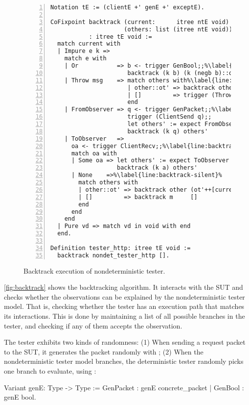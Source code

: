 \begin{figure}
\begin{lstlisting}[numbers=left]
Notation tE := (clientE +' genE +' exceptE).

CoFixpoint backtrack (current:      itree ntE void)
                     (others: list (itree ntE void))
           : itree tE void :=
  match current with
  | Impure e k =>
    match e with
    | Or           => b <- trigger GenBool;;%\label{line:backtrack-or}%
                      backtrack (k b) (k (negb b)::others)
    | Throw msg    => match others with%\label{line:backtrack-throw}%
                      | other::ot' => backtrack other ot'
                      | []         => trigger (Throw msg)
                      end
    | FromObserver => q <- trigger GenPacket;;%\label{line:backtrack-send}%
                      trigger (ClientSend q);;
                      let others' := expect FromObserver q others in
                      backtrack (k q) others'
    | ToObserver   =>
      oa <- trigger ClientRecv;;%\label{line:backtrack-recv}%
      match oa with
      | Some oa => let others' := expect ToObserver a others in
                   backtrack (k a) others'
      | None    =>%\label{line:backtrack-silent}%
        match others with
        | other::ot' => backtrack other (ot'++[current]) (* postpone *)%\label{line:backtrack-postpone}%
        | []         => backtrack m     []               (* retry    *)
        end
      end
    end
  | Pure vd => match vd in void with end
  end.

Definition tester_http: itree tE void :=
  backtrack nondet_tester_http [].
\end{lstlisting}
\vspace*{1em}
\caption{Backtrack execution of nondeterministic tester.}
\label{fig:backtrack}
\end{figure}

\autoref{fig:backtrack} shows the backtracking algorithm.  It interacts with the
SUT and checks whether the observations can be explained by the nondeterministic
tester model.  That is, checking whether the tester has an execution path that
matches its interactions.  This is done by maintaining a list of all possible
branches in the tester, and checking if any of them accepts the observation.

The tester exhibits two kinds of randomness: (1) When sending a request packet
to the SUT, it generates the packet randomly with ; (2) When the
nondeterministic tester model branches, the deterministic tester randomly picks
one branch to evaluate, using :
\begin{coq}
  Variant genE: Type -> Type :=
    GenPacket : genE concrete_packet
  | GenBool   : genE bool.
\end{coq}

